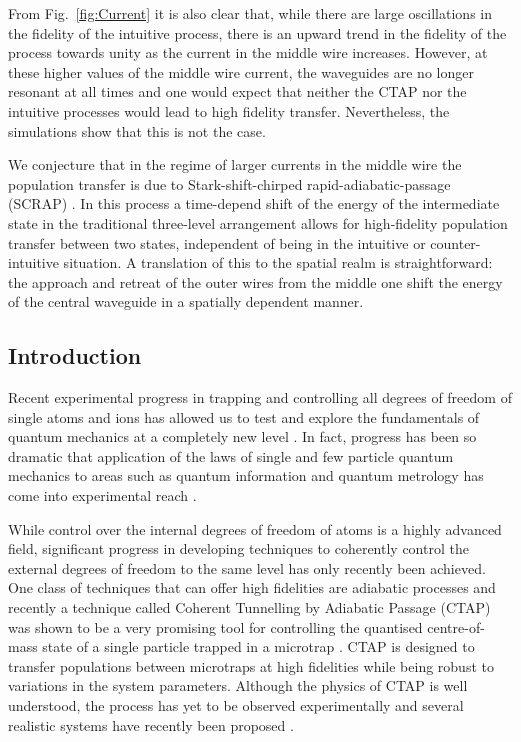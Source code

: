 From Fig.~\ref{fig:Current} it is also clear that, while there are large oscillations in the fidelity of the intuitive process, there is an upward trend in the fidelity of the process towards unity as the current in the middle wire increases. However, at these higher values of the middle wire current, the waveguides are no longer resonant at all times and one would expect that neither the CTAP nor the intuitive processes would lead to high fidelity transfer. Nevertheless, the simulations show that this is not the case.

We conjecture that in the regime of larger currents in the middle wire the population transfer is due to Stark-shift-chirped rapid-adiabatic-passage (SCRAP) \cite{Bergmann:05}. In this process a time-depend shift of the energy of the intermediate state in the traditional three-level arrangement allows for high-fidelity population transfer  between two states, independent of being in the intuitive or counter-intuitive situation. A translation of this to the spatial realm is straightforward: the approach and retreat of the outer wires from the middle one shift the energy of the central waveguide in a spatially dependent manner.











\iffalse




\subsection{Introduction}
\label{sec:Introduction}
Recent experimental progress in trapping and controlling all degrees of freedom of single atoms and ions has allowed us to test and
explore the fundamentals of quantum mechanics at a completely new level \cite{Chen:11,Bergmann:98}. In fact, progress has been so dramatic that application of the laws of single and few particle quantum mechanics to areas such as quantum information and quantum metrology has come into experimental reach \cite{Nielsen:00,Riedel:10}.

While control over the internal degrees of freedom of atoms is a highly advanced field, significant progress in developing techniques to coherently control the external degrees of freedom to the same level has only recently been achieved. One class of techniques that can offer high fidelities are adiabatic processes and recently a technique called Coherent Tunnelling by Adiabatic Passage (CTAP) was shown to be a very promising tool for controlling the quantised centre-of-mass state of a single particle trapped in a microtrap \cite{Eckert:04}. CTAP is designed to transfer populations between microtraps at high fidelities while being robust to variations in the system parameters. Although the physics of CTAP is well understood, the process has yet to be observed experimentally and several realistic systems have recently been proposed \cite{Eckert:06,Morgan:11,Kohler:13}.

